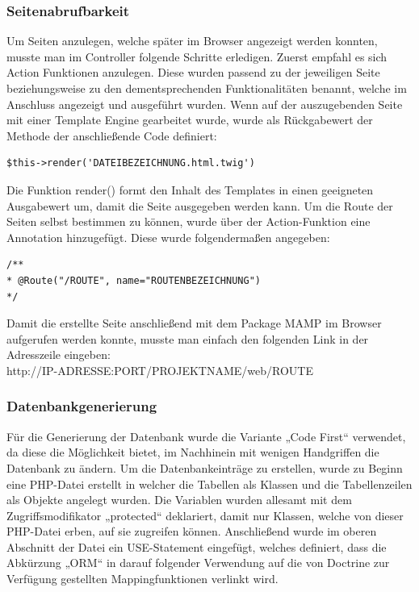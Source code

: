     \subsubsection{Seitenabrufbarkeit}

Um Seiten anzulegen, welche später im Browser angezeigt werden konnten, musste man im Controller folgende Schritte erledigen. Zuerst empfahl es sich Action Funktionen anzulegen. Diese wurden passend zu der jeweiligen Seite beziehungsweise zu den dementsprechenden Funktionalitäten benannt, welche im Anschluss angezeigt und ausgeführt wurden. Wenn auf der auszugebenden Seite mit einer Template Engine gearbeitet wurde, wurde als Rückgabewert der Methode der anschließende Code definiert:
	
	\lstset{language=php}
  	\begin{lstlisting}
$this->render('DATEIBEZEICHNUNG.html.twig')
  	\end{lstlisting}
Die Funktion render() formt den Inhalt des Templates in einen geeigneten Ausgabewert um, damit die Seite ausgegeben werden kann.
Um die Route der Seiten selbst bestimmen zu können, wurde über der Action-Funktion eine Annotation hinzugefügt. Diese wurde folgendermaßen angegeben:
	\lstset{language=php}
  	\begin{lstlisting}
/**
* @Route("/ROUTE", name="ROUTENBEZEICHNUNG")
*/
  	\end{lstlisting}
Damit die erstellte Seite anschließend mit dem Package MAMP im Browser aufgerufen werden konnte, musste man einfach den folgenden Link in der Adresszeile eingeben:\\
http://IP-ADRESSE:PORT/PROJEKTNAME/web/ROUTE

    \subsubsection{Datenbankgenerierung}

Für die Generierung der Datenbank wurde die Variante „Code First“ verwendet, da diese die Möglichkeit bietet, im Nachhinein mit wenigen Handgriffen die Datenbank zu ändern.
Um die Datenbankeinträge zu erstellen, wurde zu Beginn eine PHP-Datei erstellt in welcher die Tabellen als Klassen und die Tabellenzeilen als Objekte angelegt wurden. Die Variablen wurden allesamt mit dem Zugriffsmodifikator „protected“ deklariert, damit nur Klassen, welche von dieser PHP-Datei erben, auf sie zugreifen können. Anschließend wurde im oberen Abschnitt der Datei ein USE-Statement eingefügt, welches definiert, dass die Abkürzung „ORM“ in darauf folgender Verwendung auf die von Doctrine zur Verfügung gestellten Mappingfunktionen verlinkt wird.
	
